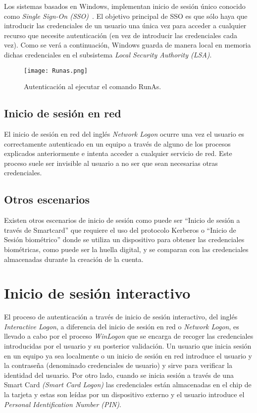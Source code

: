 Los sistemas basados en Windows, implementan inicio de sesión único conocido como {\it Single Sign-On (SSO)}~\cite{Capitulo2:SingleSignOn}. El objetivo principal de SSO es que sólo haya que introducir las credenciales de un usuario una única vez para acceder a cualquier recurso que necesite autenticación (en vez de introducir las credenciales cada vez). Como se verá a continuación, Windows guarda de manera local en memoria dichas credenciales en el subsistema {\it Local Security Authority (LSA)}.

\begin{figure}[t!] %
\begin{center}
\texttt{[image: Runas.png]}
\end{center}
\caption{Autenticación al ejecutar el comando RunAs.}
\label{RunAs}
\end{figure}

\subsection{Inicio de sesión en red}

El inicio de sesión en red del inglés {\it Network Logon} ocurre una vez el usuario es correctamente autenticado en un equipo a través de alguno de los procesos explicados anteriormente e intenta acceder a cualquier servicio de red. Este proceso suele ser invisible al usuario a no ser que sean necesarias otras credenciales. 

\subsection{Otros escenarios}

Existen otros escenarios de inicio de sesión como puede ser ``Inicio de sesión a través de Smartcard'' que requiere el uso del protocolo Kerberos o ``Inicio de Sesión biométrico'' donde se utiliza un dispositivo para obtener las credenciales biométricas, como puede ser la huella digital, y se comparan con las credenciales almacenadas durante la creación de la cuenta.  

\section{Inicio de sesión interactivo}

El proceso de autenticación a través de inicio de sesión interactivo, del inglés {\it Interactive Logon}, a diferencia del inicio de sesión en red o {\it Network Logon}, es llevado a cabo por el proceso {\it WinLogon} que se encarga de recoger las credenciales introducidas por el usuario y su posterior validación. Un usuario que inicia sesión en un equipo ya sea localmente o un inicio de sesión en red introduce el usuario y la contraseña (denominado credenciales de usuario) y sirve para verificar la identidad del usuario. Por otro lado, cuando se inicia sesión a través de una Smart Card {\it (Smart Card Logon)} las credenciales están almacenadas en el chip de la tarjeta y estas son leídas por un dispositivo externo y el usuario introduce el {\it Personal Identification Number (PIN)}.\\

